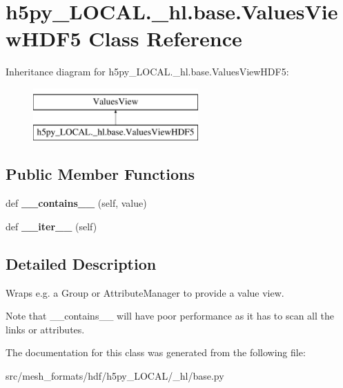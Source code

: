 \hypertarget{classh5py__LOCAL_1_1__hl_1_1base_1_1ValuesViewHDF5}{}\section{h5py\+\_\+\+L\+O\+C\+A\+L.\+\_\+hl.\+base.\+Values\+View\+H\+D\+F5 Class Reference}
\label{classh5py__LOCAL_1_1__hl_1_1base_1_1ValuesViewHDF5}
Inheritance diagram for h5py\+\_\+\+L\+O\+C\+A\+L.\+\_\+hl.\+base.\+Values\+View\+H\+D\+F5\+:\begin{figure}[H]
\begin{center}
\leavevmode
\includegraphics[height=2.000000cm]{classh5py__LOCAL_1_1__hl_1_1base_1_1ValuesViewHDF5}
\end{center}
\end{figure}
\subsection*{Public Member Functions}
\begin{DoxyCompactItemize}
\item 
\mbox{\label{classh5py__LOCAL_1_1__hl_1_1base_1_1ValuesViewHDF5_a90946460efc3368cabd618f1d1a96c21}} 
def {\bfseries \+\_\+\+\_\+contains\+\_\+\+\_\+} (self, value)
\item 
\mbox{\label{classh5py__LOCAL_1_1__hl_1_1base_1_1ValuesViewHDF5_ad95ce8a4f5e9791272189abf641560a3}} 
def {\bfseries \+\_\+\+\_\+iter\+\_\+\+\_\+} (self)
\end{DoxyCompactItemize}


\subsection{Detailed Description}
\begin{DoxyVerb}    Wraps e.g. a Group or AttributeManager to provide a value view.

    Note that __contains__ will have poor performance as it has
    to scan all the links or attributes.
\end{DoxyVerb}
 

The documentation for this class was generated from the following file\+:\begin{DoxyCompactItemize}
\item 
src/mesh\+\_\+formats/hdf/h5py\+\_\+\+L\+O\+C\+A\+L/\+\_\+hl/base.\+py\end{DoxyCompactItemize}
